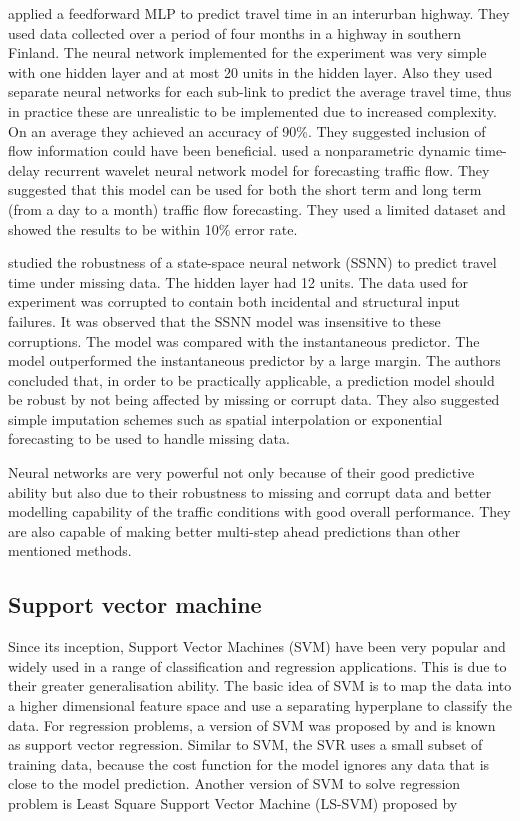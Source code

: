 \citet{innamaa2005short} applied a feedforward MLP to predict travel time in an interurban highway.
They used data collected over a period of four months in a highway in southern Finland. The neural
network implemented for the experiment was very simple with one hidden layer and at most 20 units in
the hidden layer. Also they used separate neural networks for each sub-link to predict the average
travel time, thus in practice these are unrealistic to be implemented due to increased complexity.
On an average they achieved an accuracy of 90\%. They suggested inclusion of flow information could
have been beneficial. \citet{jiang2005dynamic} used a nonparametric dynamic time-delay recurrent
wavelet neural network model for forecasting traffic flow. They suggested that this model can be
used for both the short term and long term (from a day to a month) traffic flow forecasting. They
used a limited dataset and showed the results to be within 10\% error rate.

\citet{van2005accurate} studied the robustness of a state-space neural network (SSNN) to predict
travel time under missing data. The hidden layer had 12 units. The data used for experiment was
corrupted to contain both incidental and structural input failures. It was observed that the
SSNN model was insensitive to these corruptions. The model was compared with the
instantaneous predictor. The model outperformed the instantaneous predictor by a large margin. The authors
concluded that, in order to be practically applicable, a prediction model should be robust by not
being affected by missing or corrupt data. They also suggested simple imputation schemes such as spatial
interpolation or exponential forecasting to be used to handle missing data.


Neural networks are very powerful not only because of their good predictive ability but also due to their
robustness to missing and corrupt data and better modelling capability of the traffic conditions
with good overall performance. They are also capable of making better multi-step ahead predictions
than other mentioned methods.

\subsection{Support vector machine}
Since its inception, Support Vector Machines (SVM) have been very popular and widely used in a range of
classification and regression applications. This is due to their greater generalisation ability.
The basic idea of SVM is to map the data into a higher dimensional feature space and use a separating
hyperplane to classify the data. For regression problems, a version of SVM was proposed by
\citet{smola1997support} and is known as support vector regression. Similar to SVM, the SVR uses
a small subset of training data, because the cost function for the model ignores any data that is
close to the model prediction. Another version of SVM to solve regression problem is Least
Square Support Vector Machine (LS-SVM) proposed by \citet{suykens2002least}


